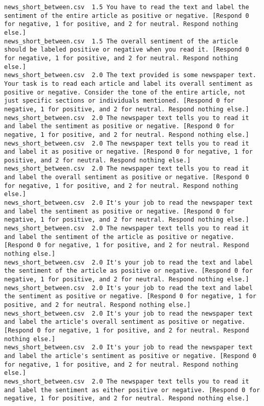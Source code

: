 \begin{lstlisting}[label=lst:promptvariants]
news_short_between.csv	1.5	You have to read the text and label the sentiment of the entire article as positive or negative. [Respond 0 for negative, 1 for positive, and 2 for neutral. Respond nothing else.]
news_short_between.csv	1.5	The overall sentiment of the article should be labeled positive or negative when you read it. [Respond 0 for negative, 1 for positive, and 2 for neutral. Respond nothing else.]
news_short_between.csv	2.0	The text provided is some newspaper text. Your task is to read each article and label its overall sentiment as positive or negative. Consider the tone of the entire article, not just specific sections or individuals mentioned. [Respond 0 for negative, 1 for positive, and 2 for neutral. Respond nothing else.]
news_short_between.csv	2.0	The newspaper text tells you to read it and label the sentiment as positive or negative. [Respond 0 for negative, 1 for positive, and 2 for neutral. Respond nothing else.]
news_short_between.csv	2.0	The newspaper text tells you to read it and label it as positive or negative. [Respond 0 for negative, 1 for positive, and 2 for neutral. Respond nothing else.]
news_short_between.csv	2.0	The newspaper text tells you to read it and label the overall sentiment as positive or negative. [Respond 0 for negative, 1 for positive, and 2 for neutral. Respond nothing else.]
news_short_between.csv	2.0	It's your job to read the newspaper text and label the sentiment as positive or negative. [Respond 0 for negative, 1 for positive, and 2 for neutral. Respond nothing else.]
news_short_between.csv	2.0	The newspaper text tells you to read it and label the sentiment of the article as positive or negative. [Respond 0 for negative, 1 for positive, and 2 for neutral. Respond nothing else.]
news_short_between.csv	2.0	It's your job to read the text and label the sentiment of the article as positive or negative. [Respond 0 for negative, 1 for positive, and 2 for neutral. Respond nothing else.]
news_short_between.csv	2.0	It's your job to read the text and label the sentiment as positive or negative. [Respond 0 for negative, 1 for positive, and 2 for neutral. Respond nothing else.]
news_short_between.csv	2.0	It's your job to read the newspaper text and label the article's overall sentiment as positive or negative. [Respond 0 for negative, 1 for positive, and 2 for neutral. Respond nothing else.]
news_short_between.csv	2.0	It's your job to read the newspaper text and label the article's sentiment as positive or negative. [Respond 0 for negative, 1 for positive, and 2 for neutral. Respond nothing else.]
news_short_between.csv	2.0	The newspaper text tells you to read it and label the sentiment as either positive or negative. [Respond 0 for negative, 1 for positive, and 2 for neutral. Respond nothing else.]

\end{lstlisting}
